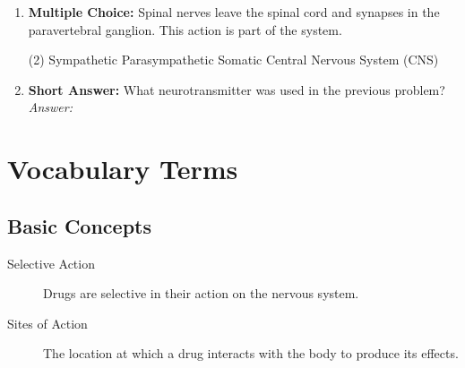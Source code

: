 \begin{enumerate}[label=\textbf{Q3.5.\arabic*}]
    \item \textbf{Multiple Choice:} Spinal nerves leave the spinal cord and synapses in the paravertebral ganglion. This action is part of the \underline{\hspace{3cm}} system.
        \begin{tasks}[label=\textcolor{\documentTheme}{(\Alph*)}, item-format=\color{\documentTheme}, label-width=1.5em, item-indent=1.7em](2)
            \task Sympathetic
            \task Parasympathetic
            \task Somatic
            \task Central Nervous System (CNS)
        \end{tasks}

    \item \textbf{Short Answer:} What neurotransmitter was used in the previous problem? \\
        \textit{Answer:} \\%
\end{enumerate}


\chapter*{Vocabulary Terms}

\section*{Basic Concepts}
\begin{description}
    \item[Selective Action] Drugs are selective in their action on the nervous system.
    \item[Sites of Action] The location at which a drug interacts with the body to produce its effects.
\end{description}

